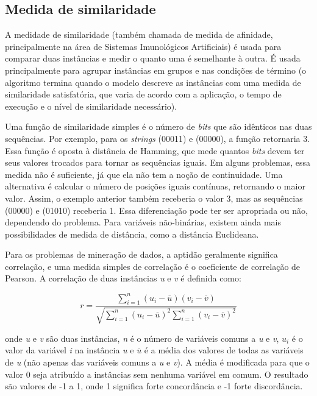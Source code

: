 \subsection{Medida de similaridade}

A medidade de similaridade (também chamada de medida de afinidade, principalmente na área de Sistemas Imunológicos Artificiais) é usada para comparar duas instâncias e medir o quanto uma é semelhante à outra. É usada principalmente para agrupar instâncias em grupos e nas condições de término (o algoritmo termina quando o modelo descreve as instâncias com uma medida de similaridade satisfatória, que varia de acordo com a aplicação, o tempo de execução e o nível de similaridade necessário).

Uma função de similaridade simples é o número de \emph{bits} que são idênticos nas duas sequências. Por exemplo, para os \emph{strings} (00011) e (00000), a função retornaria 3. Essa função é oposta à distância de Hamming, que mede quantos \emph{bits} devem ter seus valores trocados para tornar as sequências iguais. Em alguns problemas, essa medida não é suficiente, já que ela não tem a noção de continuidade. Uma alternativa é calcular o número de posições iguais contínuas, retornando o maior valor. Assim, o exemplo anterior também receberia o valor 3, mas as sequências (00000) e (01010) receberia 1. Essa diferenciação pode ter ser apropriada ou não, dependendo do problema. Para variáveis não-binárias, existem ainda mais possibilidades de medida de distância, como a distância Euclideana.

Para os problemas de mineração de dados, a aptidão geralmente significa correlação, e uma medida simples de correlação é o coeficiente de correlação de Pearson. A correlação de duas instâncias \emph{u} e \emph{v} é definida como:

\vspace{2mm}
\begin{equation}
r=\frac{
    \sum\limits_{i=1}^{n}
        (u_i-\overline{u})
        (v_i-\overline{v})
    }
    {\sqrt{
        \sum\limits_{i=1}^{n}
            (u_i-\overline{u})^2
        \sum\limits_{i=1}^{n}
            (v_i-\overline{v})^2
        }
    }
\end{equation}
\vspace{2mm}

onde \emph{u} e \emph{v} são duas instâncias, \emph{n} é o número de variáveis comuns a \emph{u} e \emph{v}, \emph{$u_i$} é o valor da variável \emph{i} na instância \emph{u} e \emph{$\overline{u}$} é a média dos valores de todas as variáveis de \emph{u} (não apenas das variáveis comuns a \emph{u} e \emph{v}). A média é modificada para que o valor 0 seja atribuído a instâncias sem nenhuma variável em comum. O resultado são valores de -1 a 1, onde 1 significa forte concordância e -1 forte discordância.

